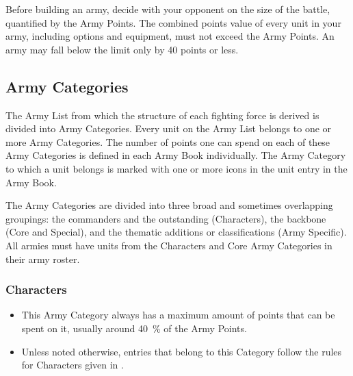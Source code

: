 Before building an army, decide with your opponent on the size of the battle, quantified by the Army Points. The combined points value of every unit in your army, including options and equipment, must not exceed the Army Points. An army may fall below the limit only by 40 points or less.

\subsection{Army Categories}
\label{army_categories}

The Army List from which the structure of each fighting force is derived is divided into Army Categories. Every unit on the Army List belongs to one or more Army Categories. The number of points one can spend on each of these Army Categories is defined in each Army Book individually. The Army Category to which a unit belongs is marked with one or more icons in the unit entry in the Army Book.

The Army Categories are divided into three broad and sometimes overlapping groupings: the commanders and the outstanding (Characters), the backbone (Core and Special), and the thematic additions or classifications (Army Specific). All armies must have units from the Characters and Core Army Categories in their army roster.

\newpage
\subsubsection{Characters}

\begin{itemize}[label={-}]
\item This Army Category always has a maximum amount of points that can be spent on it, usually around \SI{40}{\percent} of the Army Points.
\item Unless noted otherwise, entries that belong to this Category follow the rules for Characters given in .
\end{itemize}

